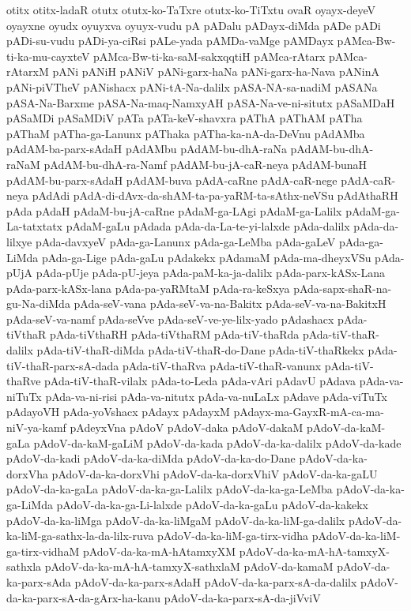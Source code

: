 {otitx
otitx-ladaR
otutx
otutx-ko-TaTxre
otutx-ko-TiTxtu
ovaR
oyayx-deyeV
oyayxne
oyudx
oyuyxva
oyuyx-vudu
pA
pADalu
pADayx-diMda
pADe
pADi
pADi-su-vudu
pADi-ya-ciRsi
pALe-yada
pAMDa-vaMge
pAMDayx
pAMca-Bw-ti-ka-mu-cayxteV
pAMca-Bw-ti-ka-saM-sakxqqtiH
pAMca-rAtarx
pAMca-rAtarxM
pANi
pANiH
pANiV
pANi-garx-haNa
pANi-garx-ha-Nava
pANinA
pANi-piVTheV
pANishacx
pANi-tA-Na-dalilx
pASA-NA-sa-nadiM
pASANa
pASA-Na-Barxme
pASA-Na-maq-NamxyAH
pASA-Na-ve-ni-situtx
pASaMDaH
pASaMDi
pASaMDiV
pATa
pATa-keV-shavxra
pAThA
pAThAM
pATha
pAThaM
pATha-ga-Lanunx
pAThaka
pATha-ka-nA-da-DeVnu
pAdAMba
pAdAM-ba-parx-sAdaH
pAdAMbu
pAdAM-bu-dhA-raNa
pAdAM-bu-dhA-raNaM
pAdAM-bu-dhA-ra-Namf
pAdAM-bu-jA-caR-neya
pAdAM-bunaH
pAdAM-bu-parx-sAdaH
pAdAM-buva
pAdA-caRne
pAdA-caR-nege
pAdA-caR-neya
pAdAdi
pAdA-di-dAvx-da-shAM-ta-pa-yaRM-ta-sAthx-neVSu
pAdAthaRH
pAda
pAdaH
pAdaM-bu-jA-caRne
pAdaM-ga-LAgi
pAdaM-ga-Lalilx
pAdaM-ga-La-tatxtatx
pAdaM-gaLu
pAdada
pAda-da-La-te-yi-lalxde
pAda-dalilx
pAda-da-lilxye
pAda-davxyeV
pAda-ga-Lanunx
pAda-ga-LeMba
pAda-gaLeV
pAda-ga-LiMda
pAda-ga-Lige
pAda-gaLu
pAdakekx
pAdamaM
pAda-ma-dheyxVSu
pAda-pUjA
pAda-pUje
pAda-pU-jeya
pAda-paM-ka-ja-dalilx
pAda-parx-kASx-Lana
pAda-parx-kASx-lana
pAda-pa-yaRMtaM
pAda-ra-keSxya
pAda-sapx-shaR-na-gu-Na-diMda
pAda-seV-vana
pAda-seV-va-na-Bakitx
pAda-seV-va-na-BakitxH
pAda-seV-va-namf
pAda-seVve
pAda-seV-ve-ye-lilx-yado
pAdashacx
pAda-tiVthaR
pAda-tiVthaRH
pAda-tiVthaRM
pAda-tiV-thaRda
pAda-tiV-thaR-dalilx
pAda-tiV-thaR-diMda
pAda-tiV-thaR-do-Dane
pAda-tiV-thaRkekx
pAda-tiV-thaR-parx-sA-dada
pAda-tiV-thaRva
pAda-tiV-thaR-vanunx
pAda-tiV-thaRve
pAda-tiV-thaR-vilalx
pAda-to-Leda
pAda-vAri
pAdavU
pAdava
pAda-va-niTuTx
pAda-va-ni-risi
pAda-va-nitutx
pAda-va-nuLaLx
pAdave
pAda-viTuTx
pAdayoVH
pAda-yoVshacx
pAdayx
pAdayxM
pAdayx-ma-GayxR-mA-ca-ma-niV-ya-kamf
pAdeyxVna
pAdoV
pAdoV-daka
pAdoV-dakaM
pAdoV-da-kaM-gaLa
pAdoV-da-kaM-gaLiM
pAdoV-da-kada
pAdoV-da-ka-dalilx
pAdoV-da-kade
pAdoV-da-kadi
pAdoV-da-ka-diMda
pAdoV-da-ka-do-Dane
pAdoV-da-ka-dorxVha
pAdoV-da-ka-dorxVhi
pAdoV-da-ka-dorxVhiV
pAdoV-da-ka-gaLU
pAdoV-da-ka-gaLa
pAdoV-da-ka-ga-Lalilx
pAdoV-da-ka-ga-LeMba
pAdoV-da-ka-ga-LiMda
pAdoV-da-ka-ga-Li-lalxde
pAdoV-da-ka-gaLu
pAdoV-da-kakekx
pAdoV-da-ka-liMga
pAdoV-da-ka-liMgaM
pAdoV-da-ka-liM-ga-dalilx
pAdoV-da-ka-liM-ga-sathx-la-da-lilx-ruva
pAdoV-da-ka-liM-ga-tirx-vidha
pAdoV-da-ka-liM-ga-tirx-vidhaM
pAdoV-da-ka-mA-hAtamxyXM
pAdoV-da-ka-mA-hA-tamxyX-sathxla
pAdoV-da-ka-mA-hA-tamxyX-sathxlaM
pAdoV-da-kamaM
pAdoV-da-ka-parx-sAda
pAdoV-da-ka-parx-sAdaH
pAdoV-da-ka-parx-sA-da-dalilx
pAdoV-da-ka-parx-sA-da-gArx-ha-kanu
pAdoV-da-ka-parx-sA-da-jiVviV
}
